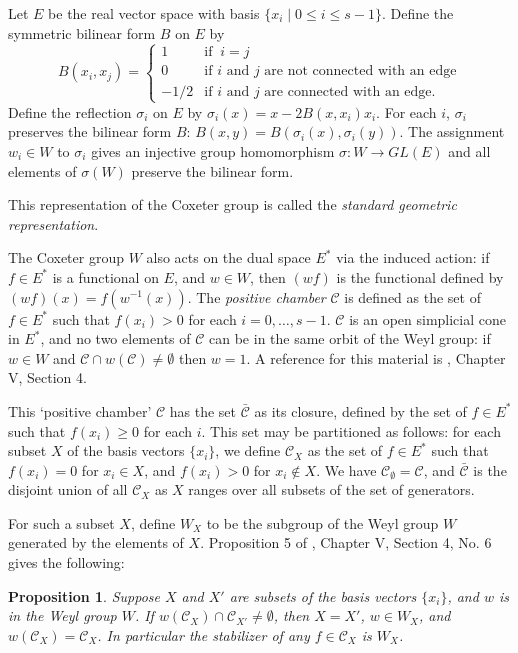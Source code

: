 \documentclass[12pt]{article}
\numberwithin{equation}{section}
\newtheorem{proposition}[equation]{Proposition}
\numberwithin{equation}{section}
\numberwithin{subeq}{equation}
\begin{document}
Let $E$ be the real vector space with basis $\{x_i\;|\; 0\leq i \leq s-1\}$.
Define the symmetric bilinear form $B$ on $E$ by
\[
B(x_i,x_j) = \begin{cases}
1 & \text{if}\;\; i=j \\
0 & \text{if $i$ and $j$ are not connected with an edge} \\
-1/2 & \text{if $i$ and $j$ are connected with an edge}.
\end{cases}
\]
Define the reflection $\sigma_i$ on $E$ by $\sigma_i(x) = x - 2B(x,x_i)x_i$.
For each $i$, $\sigma_i$ preserves the bilinear form $B$: $B(x,y) = B(\sigma_i(x),\sigma_i(y))$.
The assignment $w_i \in W$ to $\sigma_i$ gives an injective group homomorphism $\sigma:W \to GL(E)$
and all elements of $\sigma(W)$ preserve the bilinear form.

This representation of the Coxeter group is called the \emph{standard geometric representation}.

The Coxeter group $W$ also acts on the dual space $E^*$
via the induced action: if $f\in E^*$ is a functional on $E$, and $w \in W$,
then $(wf)$ is the functional defined by $(wf)(x) = f(w^{-1}(x))$.
The \emph{positive chamber} $\mathcal{C}$ is defined as the set of $f \in E^*$
such that $f(x_i) > 0$ for each $i = 0,\ldots, s-1$.
$\mathcal{C}$ is an open simplicial cone in $E^*$,
and no two elements of $\mathcal{C}$ can be in the same orbit of the Weyl group:
if $w \in W$ and $\mathcal{C} \cap w(\mathcal{C}) \neq \emptyset$ then $w=1$.
A reference for this material is \cite{Bo}, Chapter V, Section 4.

This `positive chamber' $\mathcal{C}$ has the set $\bar{\mathcal{C}}$ as its closure,
defined by the set of $f \in E^*$ such that $f(x_i) \geq 0$ for each $i$.
This set may be partitioned as follows:
for each subset $X$ of the basis vectors $\{x_i\}$,
we define $\mathcal{C}_X$ as the set of $f \in E^*$ such that
$f(x_i) = 0$ for $x_i \in X$, and $f(x_i) > 0$ for $x_i \notin X$.
We have $\mathcal{C}_\emptyset = \mathcal{C}$,
and $\bar{\mathcal{C}}$ is the disjoint union of all $\mathcal{C}_X$
as $X$ ranges over all subsets of the set of generators.

For such a subset $X$, define $W_X$ to be the subgroup of the Weyl group $W$
generated by the elements of $X$.
Proposition 5 of \cite{Bo}, Chapter V, Section 4, No. 6 gives the following:

\begin{proposition}\label{CXprop}
Suppose $X$ and $X'$ are subsets of the basis vectors $\{x_i\}$,
and $w$ is in the Weyl group $W$.
If $w(\mathcal{C}_X) \cap \mathcal{C}_{X'} \neq \emptyset$,
then $X=X'$,  $w \in W_X$, and $w(\mathcal{C}_X) = \mathcal{C}_{X}$.
In particular the stabilizer of any $f \in \mathcal{C}_X$ is $W_X$.
\end{proposition}
\end{document}
